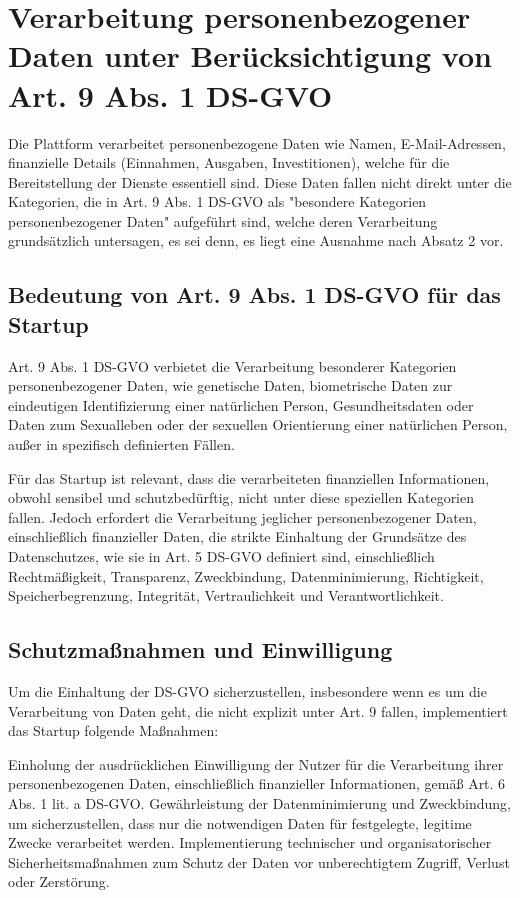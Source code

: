 \chapter{Verarbeitung personenbezogener Daten unter Berücksichtigung von Art. 9 Abs. 1 DS-GVO}

Die Plattform verarbeitet personenbezogene Daten wie Namen, E-Mail-Adressen, finanzielle Details (Einnahmen, Ausgaben, Investitionen), welche für die Bereitstellung der Dienste essentiell sind. Diese Daten fallen nicht direkt unter die Kategorien, die in Art. 9 Abs. 1 DS-GVO als "besondere Kategorien personenbezogener Daten" aufgeführt sind, welche deren Verarbeitung grundsätzlich untersagen, es sei denn, es liegt eine Ausnahme nach Absatz 2 vor.

\section{Bedeutung von Art. 9 Abs. 1 DS-GVO für das Startup}

Art. 9 Abs. 1 DS-GVO verbietet die Verarbeitung besonderer Kategorien personenbezogener Daten, wie genetische Daten, biometrische Daten zur eindeutigen Identifizierung einer natürlichen Person, Gesundheitsdaten oder Daten zum Sexualleben oder der sexuellen Orientierung einer natürlichen Person, außer in spezifisch definierten Fällen.

Für das Startup ist relevant, dass die verarbeiteten finanziellen Informationen, obwohl sensibel und schutzbedürftig, nicht unter diese speziellen Kategorien fallen. Jedoch erfordert die Verarbeitung jeglicher personenbezogener Daten, einschließlich finanzieller Daten, die strikte Einhaltung der Grundsätze des Datenschutzes, wie sie in Art. 5 DS-GVO definiert sind, einschließlich Rechtmäßigkeit, Transparenz, Zweckbindung, Datenminimierung, Richtigkeit, Speicherbegrenzung, Integrität, Vertraulichkeit und Verantwortlichkeit.

\section{Schutzmaßnahmen und Einwilligung}

Um die Einhaltung der DS-GVO sicherzustellen, insbesondere wenn es um die Verarbeitung von Daten geht, die nicht explizit unter Art. 9 fallen, implementiert das Startup folgende Maßnahmen:

    Einholung der ausdrücklichen Einwilligung der Nutzer für die Verarbeitung ihrer personenbezogenen Daten, einschließlich finanzieller Informationen, gemäß Art. 6 Abs. 1 lit. a DS-GVO.
    Gewährleistung der Datenminimierung und Zweckbindung, um sicherzustellen, dass nur die notwendigen Daten für festgelegte, legitime Zwecke verarbeitet werden.
    Implementierung technischer und organisatorischer Sicherheitsmaßnahmen zum Schutz der Daten vor unberechtigtem Zugriff, Verlust oder Zerstörung.

